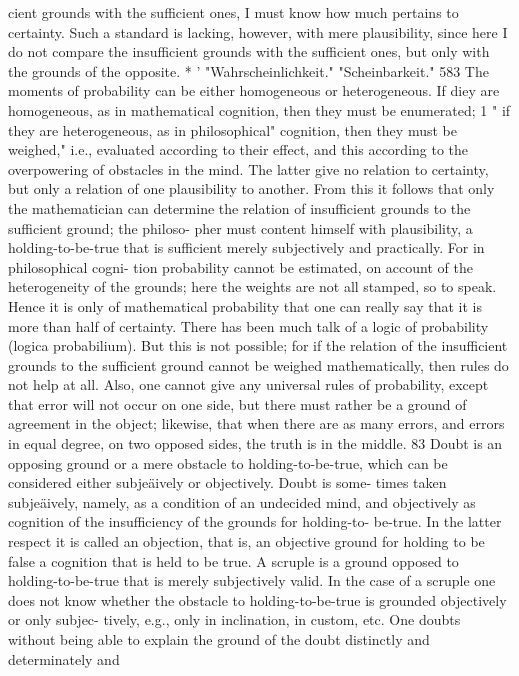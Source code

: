 cient grounds with the sufficient ones, I must know how much pertains to
certainty. Such a standard is lacking, however, with mere plausibility,
since here I do not compare the insufficient grounds with the sufficient
ones, but only with the grounds of the opposite.
*
'
"Wahrscheinlichkeit."
"Scheinbarkeit."
583
The moments of probability can be either homogeneous or heterogeneous.
If diey are homogeneous, as in mathematical cognition, then they must be
enumerated; 1 " if they are heterogeneous, as in philosophical" cognition,
then they must be weighed," i.e., evaluated according to their effect, and
this according to the overpowering of obstacles in the mind. The latter
give no relation to certainty, but only a relation of one plausibility to
another. From this it follows that only the mathematician can determine
the relation of insufficient grounds to the sufficient ground; the philoso-
pher must content himself with plausibility, a holding-to-be-true that is
sufficient merely subjectively and practically. For in philosophical cogni-
tion probability cannot be estimated, on account of the heterogeneity of
the grounds; here the weights are not all stamped, so to speak. Hence it is
only of mathematical probability that one can really say that it is more than
half of certainty.
There has been much talk of a logic of probability (logica probabilium).
But this is not possible; for if the relation of the insufficient grounds to the
sufficient ground cannot be weighed mathematically, then rules do not
help at all. Also, one cannot give any universal rules of probability, except
that error will not occur on one side, but there must rather be a ground of
agreement in the object; likewise, that when there are as many errors, and
errors in equal degree, on two opposed sides, the truth is in the middle.
83
Doubt is an opposing ground or a mere obstacle to holding-to-be-true,
which can be considered either subjeäively or objectively. Doubt is some-
times taken subjeäively, namely, as a condition of an undecided mind, and
objectively as cognition of the insufficiency of the grounds for holding-to-
be-true. In the latter respect it is called an objection, that is, an objective
ground for holding to be false a cognition that is held to be true.
A scruple is a ground opposed to holding-to-be-true that is merely
subjectively valid. In the case of a scruple one does not know whether the
obstacle to holding-to-be-true is grounded objectively or only subjec-
tively, e.g., only in inclination, in custom, etc. One doubts without being
able to explain the ground of the doubt distinctly and determinately and
